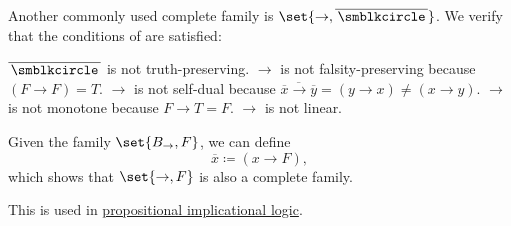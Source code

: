 \begin{example}
\begin{thmenum}
     Another commonly used complete family is \( \set{ \rightarrow, \overline{\placeholder} } \).
    We verify that the conditions of  are satisfied:
    \begin{refenum}
       \( \overline{\placeholder} \) is not truth-preserving.
       \( \rightarrow \) is not falsity-preserving because \( (F \rightarrow F) = T \).
       \( \rightarrow \) is not self-dual because \( \overline{\overline{x} \rightarrow \overline{y}} = (y \rightarrow x) \neq (x \rightarrow y) \).
       \( \rightarrow \) is not monotone because \( F \rightarrow T = F \).
       \( \rightarrow \) is not linear.
    \end{refenum}

     Given the family \( \set{ B_\rightarrow, F } \), we can define
    \begin{equation*}
      \overline{x} \coloneqq (x \rightarrow F),
    \end{equation*}
    which shows that \( \set{ \rightarrow, F } \) is also a complete family.

    This is used in \hyperref[def:propositional_implicational_logic]{propositional implicational logic}.
  \end{thmenum}
\end{example}
